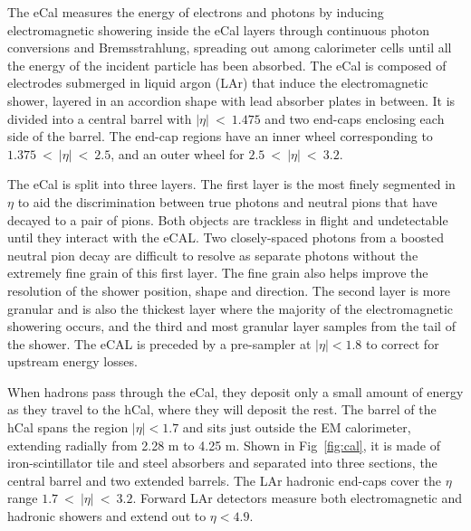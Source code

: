 
The eCal measures the energy of electrons and photons by inducing electromagnetic showering inside the eCal layers through continuous photon conversions and Bremsstrahlung, spreading out among calorimeter cells until all the energy of the incident particle has been absorbed.  The eCal is composed of electrodes submerged in liquid argon (LAr) that induce the electromagnetic shower, layered in an accordion shape with lead absorber plates in between. It is divided into a central barrel with $|\eta|~<~1.475$ and two end-caps enclosing each side of the barrel.  The end-cap regions have an inner wheel corresponding to $1.375~<~|\eta|~<~2.5$, and an outer wheel for $2.5~<~|\eta|~<~3.2$.  

The eCal is split into three layers.  The first layer is the most finely segmented in $\eta$ to aid the discrimination between true photons and neutral pions that have decayed to a pair of pions.  Both objects are trackless in flight and undetectable until they interact with the eCAL.  Two closely-spaced photons from a boosted neutral pion decay are difficult to resolve as separate photons without the extremely fine grain of this first layer.  The fine grain also helps improve the resolution of the shower position, shape and direction.  The second layer is more granular and is also the thickest layer where the majority of the electromagnetic showering occurs, and the third and most granular layer samples from the tail of the shower.  The eCAL is preceded by a pre-sampler at $|\eta| < 1.8$ to correct for upstream energy losses.  


When hadrons pass through the eCal, they deposit only a small amount of energy as they travel to the hCal, where they will deposit the rest.  The barrel of the hCal spans the region $|\eta| < 1.7$ and sits just outside the EM calorimeter, extending radially from 2.28 m to 4.25 m.  Shown in Fig~\ref{fig:cal}, it is made of iron-scintillator tile and steel absorbers and separated into three sections, the central barrel and two extended barrels. The LAr hadronic end-caps cover the $\eta$ range $1.7~<~|\eta|~<~3.2$.  Forward LAr detectors measure both electromagnetic and hadronic showers and extend out to $\eta<4.9$.


